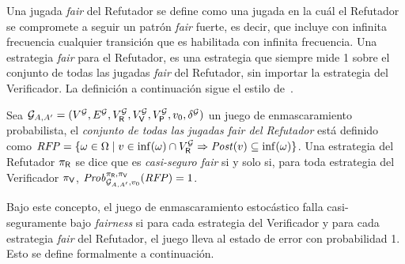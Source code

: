 Una jugada \emph{fair} del Refutador se define como una jugada en la cuál el Refutador se compromete a seguir un patrón \emph{fair} fuerte, es decir, que incluye con infinita frecuencia cualquier transición que es habilitada con infinita frecuencia. Una estrategia \emph{fair} para el Refutador, es una estrategia que siempre mide 1 sobre el conjunto de todas las jugadas \emph{fair} del Refutador, sin importar la estrategia del Verificador. La definición a continuación sigue el estilo de~\cite{DBLP:journals/dc/BaierK98,BaierK08,CastroDDP22}.



%
\begin{definition}
  Sea $\mathcal{G}_{A,A'} = (V^{\mathcal{G}}, E^{\mathcal{G}}, V^{\mathcal{G}}_{\mathsf{R}}, V^{\mathcal{G}}_{\mathsf{V}}, V^{\mathcal{G}}_{\mathsf{P}}, v_0, \delta^{\mathcal{G}})$ un juego de enmascaramiento probabilista,
  el \emph{conjunto de todas las jugadas \emph{fair} del Refutador} está definido como
  $ 
	\mathit{RFP} = \{ \omega \in \Omega \mid v \in \inf(\omega) \cap V^{\mathcal{G}}_{\mathsf{R}} \Rightarrow \mathit{Post}(v) \subseteq \inf(\omega) \}
  $.
  Una estrategia del Refutador $\pi_{\mathsf{R}}$ se dice que es \emph{casi-seguro fair} si y solo si, para toda estrategia del Verificador
  $\pi_{\mathsf{V}}$,
  $\mathit{Prob}^{\pi_{\mathsf{R}}, \pi_{\mathsf{V}}}_{\mathcal{G}_{A,A'},v_0}(\mathit{RFP}) = 1$.
\end{definition}



Bajo este concepto, el juego de enmascaramiento estocástico falla casi-seguramente bajo \emph{fairness} si para cada estrategia del Verificador y para cada estrategia \emph{fair} del Refutador, el juego lleva al estado de error con probabilidad 1. Esto se define formalmente a continuación.



